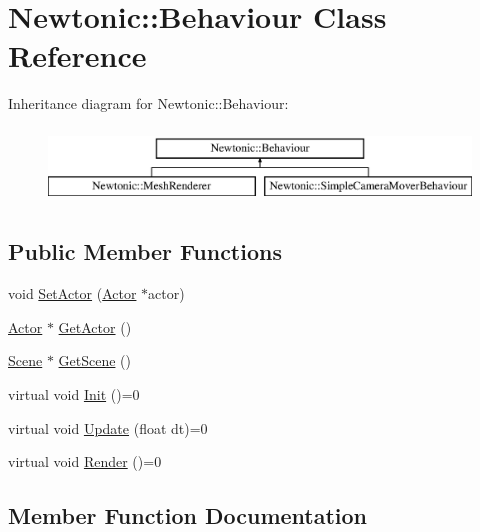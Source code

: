 \hypertarget{classNewtonic_1_1Behaviour}{}\section{Newtonic\+::Behaviour Class Reference}
\label{classNewtonic_1_1Behaviour}
Inheritance diagram for Newtonic\+::Behaviour\+:\begin{figure}[H]
\begin{center}
\leavevmode
\includegraphics[height=2.000000cm]{classNewtonic_1_1Behaviour}
\end{center}
\end{figure}
\subsection*{Public Member Functions}
\begin{DoxyCompactItemize}
\item 
void \mbox{\hyperlink{classNewtonic_1_1Behaviour_a22e802f66a36851f9af06f7482d2f283}{Set\+Actor}} (\mbox{\hyperlink{classNewtonic_1_1Actor}{Actor}} $\ast$actor)
\item 
\mbox{\hyperlink{classNewtonic_1_1Actor}{Actor}} $\ast$ \mbox{\hyperlink{classNewtonic_1_1Behaviour_addf278bf0da8eca2838cadb49cdc3d65}{Get\+Actor}} ()
\item 
\mbox{\hyperlink{classNewtonic_1_1Scene}{Scene}} $\ast$ \mbox{\hyperlink{classNewtonic_1_1Behaviour_aa042bb199f006f08571bd9465a9471b6}{Get\+Scene}} ()
\item 
virtual void \mbox{\hyperlink{classNewtonic_1_1Behaviour_a54a1d17213841de1d7bde8aaadfc99e4}{Init}} ()=0
\item 
virtual void \mbox{\hyperlink{classNewtonic_1_1Behaviour_aaed714f38c7b270381e81958b280d248}{Update}} (float dt)=0
\item 
virtual void \mbox{\hyperlink{classNewtonic_1_1Behaviour_ab219950e152ca8b9cb6f54d024667627}{Render}} ()=0
\end{DoxyCompactItemize}


\subsection{Member Function Documentation}
\mbox{\label{classNewtonic_1_1Behaviour_addf278bf0da8eca2838cadb49cdc3d65}} 
